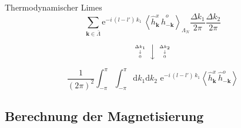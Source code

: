 \documentclass[11pt]{beamer}
\newcommand{\corr}[1]{\left\langle #1 \right\rangle}
\renewcommand{\d}[0]{\mathrm{d}}
\begin{document}
    \begin{frame}{Thermodynamischer Limes}
    \begin{equation} \nonumber
        \sum_{\bm{k} \in \bar{\Lambda}}  \mathrm{e}^{-i\,(l-l') \,k_1} \,\corr{\hat{h}_{\bm{k}}^{x}\, \hat{h}_{-\bm{k}}^{o}}_{\Lambda_N} \frac{\Delta k_1}{2\pi}\frac{\Delta k_2}{2\pi}
    \end{equation}
    
    \begin{equation}\nonumber
   	{\tiny \begin{array}{c} \Delta k_1\\\downarrow\\0 \end{array} }{\Big\downarrow}{ \tiny\begin{array}{c}\Delta k_2\\\downarrow\\0 \end{array}}
    \end{equation}
    
    \begin{equation} \nonumber
     \frac{1}{(2\pi)^2}\int_{-\pi}^{\pi} \int_{-\pi}^{\pi} \d k_1 \d k_2 \,\,\mathrm{e}^{-i\, (l-l') \,k_1} \corr{\hat{h}_{\bm{k}}^{x}\, \hat{h}_{-\bm{k}}^{o}}
    \end{equation} 
    \end{frame}


\subsection{Berechnung der Magnetisierung}
\end{document}
